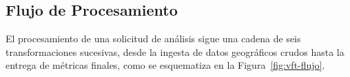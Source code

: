 \subsection{Flujo de Procesamiento}
\label{subsec:vft-flujo}

El procesamiento de una solicitud de análisis sigue una cadena de seis
transformaciones sucesivas, desde la ingesta de datos geográficos crudos hasta
la entrega de métricas finales, como se esquematiza en la
Figura~\ref{fig:vft-flujo}.

\begin{figure}[H]
    \centering
    \DIFdelbeginFL %



\end{figure}
